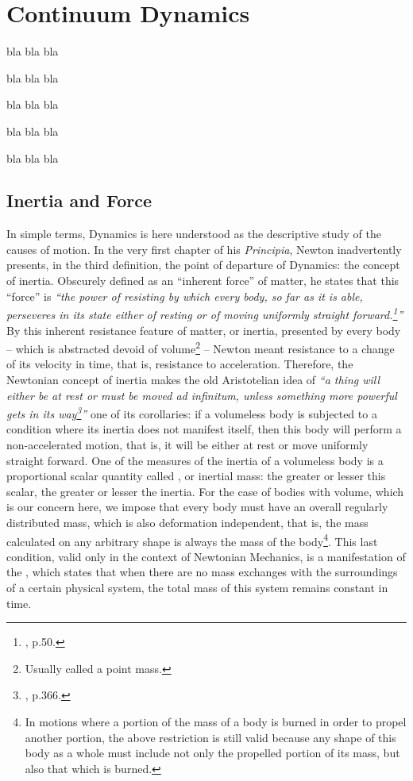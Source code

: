 \chapter{Continuum Dynamics}

bla bla bla        

bla bla bla 

bla bla bla 

bla bla bla 

bla bla bla 

\section{Inertia and Force} 

In simple terms, Dynamics is here understood as the descriptive study of the causes of motion. In the very first chapter of his \emph{Principia}, Newton inadvertently presents, in the third definition, the point of departure of Dynamics: the concept of inertia. Obscurely defined as an ``inherent force'' of matter, he states that this ``force'' is \emph{``the power of resisting by which every body, so far as it is able, perseveres in its state either of resting or of moving uniformly straight forward.\footnote{\cite{newton_1999_1}, p.50.}''} By this inherent resistance feature of matter, or inertia, presented by every body -- which is abstracted devoid of volume\footnote{Usually called a point mass.} -- Newton meant resistance to a change of its velocity in time, that is, resistance to acceleration. Therefore, the Newtonian concept of inertia makes the old Aristotelian idea of \emph{``a thing will either be at rest or must be moved \emph{ad infinitum}, unless something more powerful gets in its way\footnote{\cite{aristotle_1984_1}, p.366.}''} one of its corollaries: if a volumeless body is subjected to a condition where its inertia does not manifest itself, then this body will perform a non-accelerated motion, that is, it will be either at rest or move uniformly straight forward. One of the measures of the inertia of a volumeless body is a proportional scalar quantity called , or inertial mass: the greater or lesser this scalar, the greater or lesser the inertia. For the case of bodies with volume, which is our concern here, we impose that every body must have an overall regularly distributed mass, which is also deformation independent, that is, the mass calculated on any arbitrary shape is always the mass of the body\footnote{In motions where a portion of the mass of a body is burned in order to propel another portion, the above restriction is still valid because any shape of this body as a whole must include not only the propelled portion of its mass, but also that which is burned.}. This last condition, valid only in the context of Newtonian Mechanics, is a manifestation of the , which states that when there are no mass exchanges with the surroundings of a certain physical system, the total mass of this system remains constant in time.

